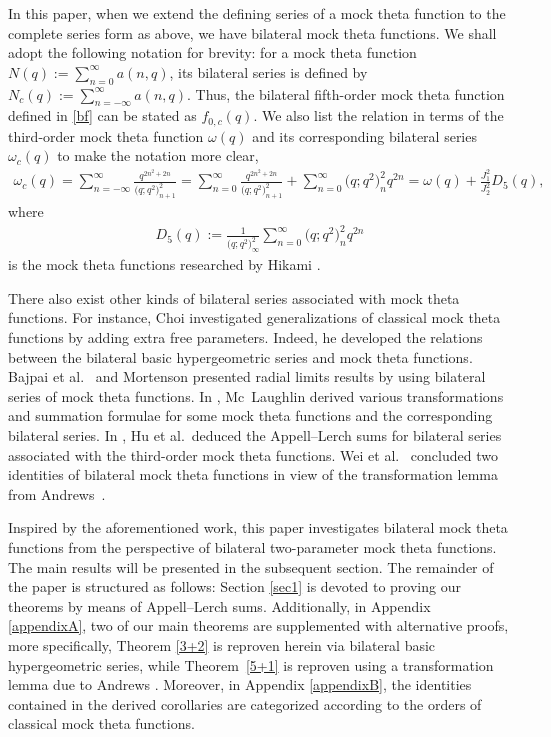 \documentclass[10pt,a4paper]{amsart}
\numberwithin{equation}{section}
\begin{document}
In this paper, when we extend the defining series of a mock theta function to the complete series form as above, we have bilateral mock theta functions. We shall adopt the following notation for brevity: for a mock theta function
$N(q):=\sum_{n=0}^{\infty}a(n,q)$,
its bilateral series is defined by
$N_c(q):=\sum_{n=-\infty}^{\infty}a(n,q)$.
Thus, the bilateral fifth-order mock theta function defined in \eqref{bf} can be stated as $f_{0,c}(q)$.
 We also list the relation in terms of the third-order mock theta function $\omega(q)$ and its corresponding bilateral series $\omega_c(q)$ to make the notation more clear,
\begin{align}\label{0-1}
\omega_c(q)=\sum_{n=-\infty}^{\infty}\frac{q^{2n^2+2n}}{\bigl(q;q^2\bigr)_{n+1}^2}
=\sum_{n=0}^{\infty}\frac{q^{2n^2+2n}}{\bigl(q;q^2\bigr)_{n+1}^2}
+\sum_{n=0}^{\infty}\bigl(q;q^2\bigr)_n^2q^{2n}
=\omega(q)+\frac{J_1^2}{J_2^2}D_5(q),
\end{align}
where
\begin{align*}
D_5(q):=\frac{1}{\bigl(q;q^2\bigr)_{\infty}^2}\sum_{n=0}^{\infty}\bigl(q;q^2\bigr)_n^2q^{2n}
\end{align*}
is the mock theta functions researched by Hikami \cite{Hi}.

There also exist other kinds of bilateral series associated with mock theta functions. For instance, Choi \cite{Ch} investigated generalizations of classical mock theta functions by adding extra free parameters. Indeed, he developed the relations between the bilateral basic hypergeometric series and mock theta functions. Bajpai et al.\ \cite{BKLMR} and Mortenson \cite{Mo} presented radial limits results by using bilateral series of mock theta functions. In \cite{Mc}, Mc~Laughlin derived various transformations and summation formulae for some mock theta functions and the corresponding bilateral series. In \cite{HSZ}, Hu et al.\ deduced the Appell--Lerch sums for bilateral series associated with the third-order mock theta functions. Wei et al.\ \cite[Corollaries~2.1 and 2.2]{WYH} concluded two identities of bilateral mock theta functions in view of the transformation lemma from Andrews~\cite{A}.


Inspired by the aforementioned work, this paper investigates bilateral mock theta functions from the perspective of bilateral two-parameter mock theta functions. The main results will be presented in the subsequent section. The remainder of the paper is structured as follows: Section \ref{sec1} is devoted to proving our theorems by means of Appell--Lerch sums. Additionally, in Appendix \ref{appendixA}, two of our main theorems are supplemented with alternative proofs, more specifically, Theorem \ref{3+2} is reproven herein via bilateral basic hypergeometric series, while Theorem~\ref{5+1} is reproven using a transformation lemma due to Andrews \cite{A}. Moreover, in Appendix \ref{appendixB}, the identities contained in the derived corollaries are categorized according to the orders of classical mock theta functions.
\end{document}
